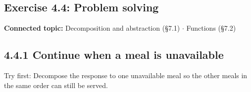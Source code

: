 \documentclass[11pt]{article}
\begin{document}
\begin{keepsection}
\section{Exercise 4.4: Problem solving}

\textbf{Connected topic:} Decomposition and abstraction (§7.1) \ensuremath{\cdot} Functions (§7.2)

\begin{keepsection}
\subsection{4.4.1 Continue when a meal is unavailable}

Try first: Decompose the response to one unavailable meal so the other meals in the same order can still be served.

\end{keepsection}
\end{keepsection}


\clearpage
\end{document}
